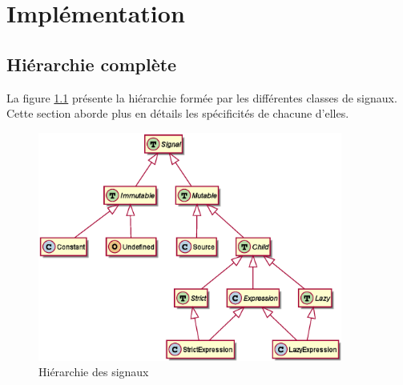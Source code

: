 \section{Implémentation}

\subsection{Hiérarchie complète}
\label{sec:sig-hierarchy}

La figure \ref{sec:sig-hierarchy} présente la hiérarchie formée par les différentes classes de signaux. Cette section aborde plus en détails les spécificités de chacune d'elles.

\begin{figure}[h]
	\centering
	\includegraphics[width=10cm]{img/sig_hierarchy.eps}
	\caption{Hiérarchie des signaux}
	\label{fig:sig-hierarchy}
\end{figure}

